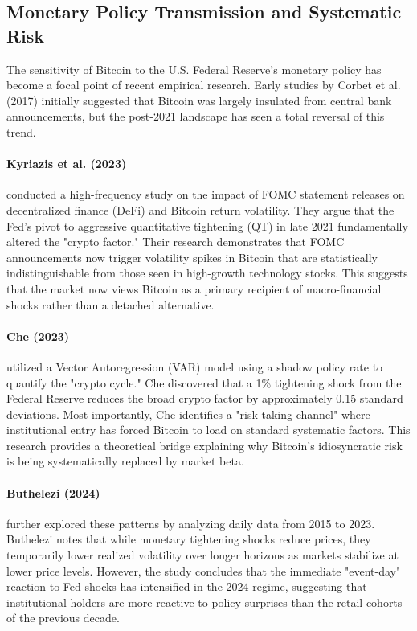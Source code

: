 \documentclass[10pt, conference, compsocconf]{IEEEtran}
\begin{document}

\subsection{Monetary Policy Transmission and Systematic Risk}

The sensitivity of Bitcoin to the U.S. Federal Reserve’s monetary policy has become a focal point of recent empirical research. Early studies by Corbet et al. (2017) initially suggested that Bitcoin was largely insulated from central bank announcements, but the post-2021 landscape has seen a total reversal of this trend.

\paragraph{Kyriazis et al. (2023)} conducted a high-frequency study on the impact of FOMC statement releases on decentralized finance (DeFi) and Bitcoin return volatility. They argue that the Fed's pivot to aggressive quantitative tightening (QT) in late 2021 fundamentally altered the "crypto factor." Their research demonstrates that FOMC announcements now trigger volatility spikes in Bitcoin that are statistically indistinguishable from those seen in high-growth technology stocks. This suggests that the market now views Bitcoin as a primary recipient of macro-financial shocks rather than a detached alternative.

\paragraph{Che (2023)} utilized a Vector Autoregression (VAR) model using a shadow policy rate to quantify the "crypto cycle." Che discovered that a 1\% tightening shock from the Federal Reserve reduces the broad crypto factor by approximately 0.15 standard deviations. Most importantly, Che identifies a "risk-taking channel" where institutional entry has forced Bitcoin to load on standard systematic factors. This research provides a theoretical bridge explaining why Bitcoin’s idiosyncratic risk is being systematically replaced by market beta.

\paragraph{Buthelezi (2024)} further explored these patterns by analyzing daily data from 2015 to 2023. Buthelezi notes that while monetary tightening shocks reduce prices, they temporarily lower realized volatility over longer horizons as markets stabilize at lower price levels. However, the study concludes that the immediate "event-day" reaction to Fed shocks has intensified in the 2024 regime, suggesting that institutional holders are more reactive to policy surprises than the retail cohorts of the previous decade.
\end{document}
